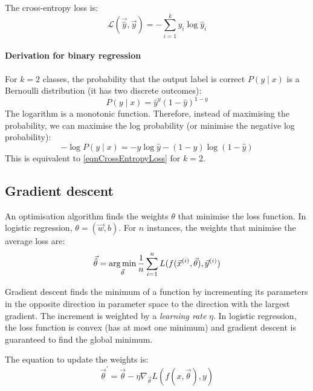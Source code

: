 The cross-entropy loss is:
\begin{equation}
  \label{eqnCrossEntropyLoss}
  \mathcal{L}(\vec{\hat{y}}, \vec{y}) = - \sum_{i = 1}^{k} y_i \log \hat{y}_i
\end{equation}

\paragraph{Derivation for binary regression}

For $k = 2$ classes, the probability that the output label is correct $P(y \mid x)$ is a Bernoulli distribution (it has two discrete outcomes):
\begin{equation}
  \label{eqnDerivation1}
  P(y \mid x) = \hat{y}^y (1 - \hat{y})^{1 - y}
\end{equation}
The logarithm is a monotonic function.
Therefore, instead of maximising the probability, we can maximise the log probability (or minimise the negative log probability):
\begin{equation}
  \label{eqnDerivation2}
  - \log P(y \mid x) = - y \log \hat{y} - (1 - y) \log (1 - \hat{y})
\end{equation}
This is equivalent to \ref{eqnCrossEntropyLoss} for $k = 2$.

\subsection{Gradient descent}

An optimisation algorithm finds the weights $\theta$ that minimise the loss function.
In logistic regression, $\theta = (\vec{w}, b)$.
For $n$ instances, the weights that minimise the average loss are:
\begin{equation}
  \label{eqnWeightsOptimal}
  \vec{\hat{\theta}} = \operatorname*{arg\,min}_{\vec{\theta}} \frac{1}{n} \sum_{i = 1}^{n} L(f(\vec{x}^{(i)}, \vec{\theta}), \vec{y}^{(i)})
\end{equation}

Gradient descent finds the minimum of a function by incrementing its parameters in the opposite direction in parameter space to the direction with the largest gradient.
The increment is weighted by a \textit{learning rate} $\eta$.
In logistic regression, the loss function is convex (has at most one minimum) and gradient descent is guaranteed to find the global minimum.

The equation to update the weights is:
\begin{equation}
  \label{eqnWeightsUpdate}
  \vec{\theta}^\prime = \vec{\theta} - \eta \nabla_{\vec{\theta}} L(f(x, \vec{\theta}), y)
\end{equation}

